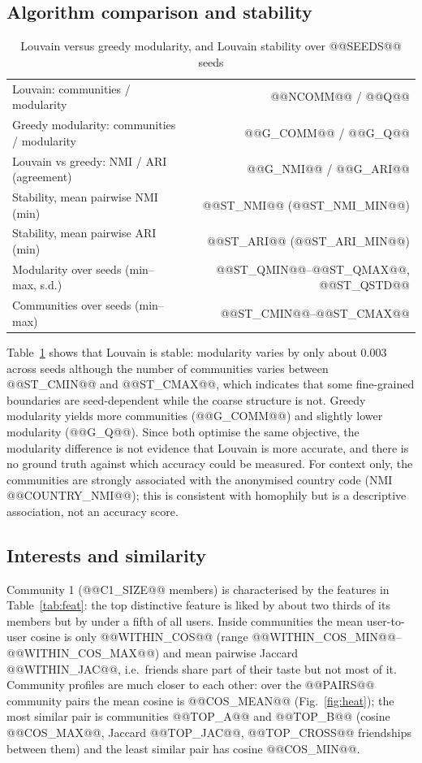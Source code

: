 \documentclass[conference]{IEEEtran}
\begin{document}
\subsection{Algorithm comparison and stability}
\begin{table}[t]
\caption{Louvain versus greedy modularity, and Louvain stability over @@SEEDS@@ seeds}
\label{tab:algo}
\centering
\begin{tabular}{lr}
\toprule
Louvain: communities / modularity & @@NCOMM@@ / @@Q@@ \\
Greedy modularity: communities / modularity & @@G_COMM@@ / @@G_Q@@ \\
Louvain vs greedy: NMI / ARI (agreement) & @@G_NMI@@ / @@G_ARI@@ \\
Stability, mean pairwise NMI (min) & @@ST_NMI@@ (@@ST_NMI_MIN@@) \\
Stability, mean pairwise ARI (min) & @@ST_ARI@@ (@@ST_ARI_MIN@@) \\
Modularity over seeds (min--max, s.d.) & @@ST_QMIN@@--@@ST_QMAX@@, @@ST_QSTD@@ \\
Communities over seeds (min--max) & @@ST_CMIN@@--@@ST_CMAX@@ \\
\bottomrule
\end{tabular}
\end{table}

Table~\ref{tab:algo} shows that Louvain is stable: modularity varies by only about 0.003 across seeds although the number of communities varies between @@ST_CMIN@@ and @@ST_CMAX@@, which indicates that some fine-grained boundaries are seed-dependent while the coarse structure is not. Greedy modularity yields more communities (@@G_COMM@@) and slightly lower modularity (@@G_Q@@). Since both optimise the same objective, the modularity difference is not evidence that Louvain is more accurate, and there is no ground truth against which accuracy could be measured. For context only, the communities are strongly associated with the anonymised country code (NMI @@COUNTRY_NMI@@); this is consistent with homophily \cite{mcpherson2001} but is a descriptive association, not an accuracy score.

\subsection{Interests and similarity}
Community 1 (@@C1_SIZE@@ members) is characterised by the features in Table~\ref{tab:feat}: the top distinctive feature is liked by about two thirds of its members but by under a fifth of all users. Inside communities the mean user-to-user cosine is only @@WITHIN_COS@@ (range @@WITHIN_COS_MIN@@--@@WITHIN_COS_MAX@@) and mean pairwise Jaccard @@WITHIN_JAC@@, i.e.\ friends share part of their taste but not most of it. Community profiles are much closer to each other: over the @@PAIRS@@ community pairs the mean cosine is @@COS_MEAN@@ (Fig.~\ref{fig:heat}); the most similar pair is communities @@TOP_A@@ and @@TOP_B@@ (cosine @@COS_MAX@@, Jaccard @@TOP_JAC@@, @@TOP_CROSS@@ friendships between them) and the least similar pair has cosine @@COS_MIN@@.
\end{document}
